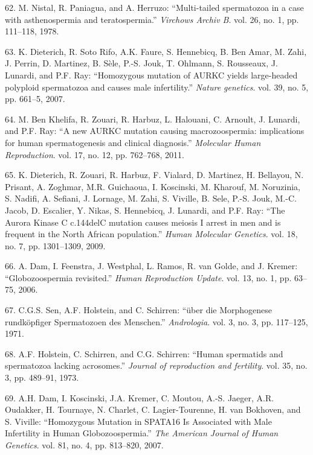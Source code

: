 \documentclass[12pt,twoside]{reedthesis}
\theoremstyle{definition}
\theoremstyle{definition}
\theoremstyle{remark}
\begin{document}
  \hypertarget{ref-Nistal}{}
  62. M. Nistal, R. Paniagua, and A. Herruzo: ``Multi-tailed spermatozoa
  in a case with asthenospermia and teratospermia.'' \emph{Virchows Archiv
  B}. vol. 26, no. 1, pp. 111--118, 1978.
  
  \hypertarget{ref-Dieterich2007}{}
  63. K. Dieterich, R. Soto Rifo, A.K. Faure, S. Hennebicq, B. Ben Amar,
  M. Zahi, J. Perrin, D. Martinez, B. Sèle, P.-S. Jouk, T. Ohlmann, S.
  Rousseaux, J. Lunardi, and P.F. Ray: ``Homozygous mutation of AURKC
  yields large-headed polyploid spermatozoa and causes male infertility.''
  \emph{Nature genetics}. vol. 39, no. 5, pp. 661--5, 2007.
  
  \hypertarget{ref-BenKhelifa2011}{}
  64. M. Ben Khelifa, R. Zouari, R. Harbuz, L. Halouani, C. Arnoult, J.
  Lunardi, and P.F. Ray: ``A new AURKC mutation causing macrozoospermia:
  implications for human spermatogenesis and clinical diagnosis.''
  \emph{Molecular Human Reproduction}. vol. 17, no. 12, pp. 762--768,
  2011.
  
  \hypertarget{ref-Dieterich2009}{}
  65. K. Dieterich, R. Zouari, R. Harbuz, F. Vialard, D. Martinez, H.
  Bellayou, N. Prisant, A. Zoghmar, M.R. Guichaoua, I. Koscinski, M.
  Kharouf, M. Noruzinia, S. Nadifi, A. Sefiani, J. Lornage, M. Zahi, S.
  Viville, B. Sele, P.-S. Jouk, M.-C. Jacob, D. Escalier, Y. Nikas, S.
  Hennebicq, J. Lunardi, and P.F. Ray: ``The Aurora Kinase C c.144delC
  mutation causes meiosis I arrest in men and is frequent in the North
  African population.'' \emph{Human Molecular Genetics}. vol. 18, no. 7,
  pp. 1301--1309, 2009.
  
  \hypertarget{ref-Dam2006}{}
  66. A. Dam, I. Feenstra, J. Westphal, L. Ramos, R. van Golde, and J.
  Kremer: ``Globozoospermia revisited.'' \emph{Human Reproduction Update}.
  vol. 13, no. 1, pp. 63--75, 2006.
  
  \hypertarget{ref-Sen2009}{}
  67. C.G.S. Sen, A.F. Holstein, and C. Schirren: ``über die Morphogenese
  rundköpfiger Spermatozoen des Menschen.'' \emph{Andrologia}. vol. 3, no.
  3, pp. 117--125, 1971.
  
  \hypertarget{ref-Holstein1973}{}
  68. A.F. Holstein, C. Schirren, and C.G. Schirren: ``Human spermatids
  and spermatozoa lacking acrosomes.'' \emph{Journal of reproduction and
  fertility}. vol. 35, no. 3, pp. 489--91, 1973.
  
  \hypertarget{ref-Dam2007a}{}
  69. A.H. Dam, I. Koscinski, J.A. Kremer, C. Moutou, A.-S. Jaeger, A.R.
  Oudakker, H. Tournaye, N. Charlet, C. Lagier-Tourenne, H. van Bokhoven,
  and S. Viville: ``Homozygous Mutation in SPATA16 Is Associated with Male
  Infertility in Human Globozoospermia.'' \emph{The American Journal of
  Human Genetics}. vol. 81, no. 4, pp. 813--820, 2007.
  
\end{document}
